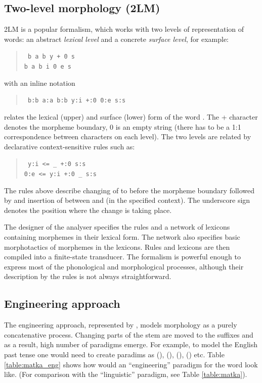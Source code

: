 \subsection{Two-level morphology (2LM)}
2LM is a popular formalism, which works with two levels of representation of words: an abstract \emph{lexical level} and a concrete \emph{surface level}, for example:
\begin{quote}\begin{flushleft}
\tt 
b a b y + 0 s\\
b a b i 0 e s
\end{flushleft}
\end{quote} with an inline notation 
\begin{quote}\begin{flushleft}
\tt 
b:b a:a b:b y:i +:0 0:e s:s
\end{flushleft}
\end{quote}
relates the lexical (upper) and surface (lower) form of the word  . The + character denotes the morpheme boundary, 0 is an empty string (there has to be a 1:1 correspondence between characters on each level). The two levels are related by declarative context-sensitive rules such as: 
\begin{quote}\begin{flushleft}
\tt 
y:i <= \_ +:0 s:s\\
0:e <= y:i +:0 \_ s:s
\end{flushleft}
\end{quote}
The rules above describe changing of  to  before the morpheme boundary followed by  and insertion of  between  and  (in the specified context). The underscore sign denotes the position where the change is taking place.

The designer of the analyser specifies the rules and a network of lexicons containing morphemes in their lexical form. The network also specifies basic morphotactics of morphemes in the lexicons. Rules and lexicons are then compiled into a finite-state transducer. The formalism is powerful enough to express  most of the phonological and morphological processes, although their description by the rules is not always straightforward.

\subsection{Engineering approach}\label{sec:engineer}
The engineering approach, represented by \citep{hajic-2004-hab}, models morphology as a purely concatenative process. Changing parts of the stem are moved to the suffixes and as a result, high number of paradigms emerge. For example, to model the English past tense one would need to create paradims as (), (), (), () etc.
 Table \ref{table:matka_eng} shows how would an ``engineering'' paradigm for the word  look like. (For comparison with the ``linguistic'' paradigm, see Table \ref{table:matka}). 
 
